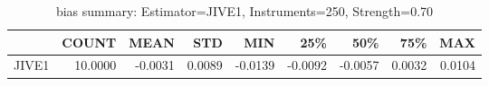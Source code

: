\begin{table}[ht]
\centering
\caption{bias summary: Estimator=JIVE1, Instruments=250, Strength=0.70}
\begin{tabular}{lrrrrrrrr}
\toprule
 & COUNT & MEAN & STD & MIN & 25\% & 50\% & 75\% & MAX \\
\midrule
JIVE1 & 10.0000 & -0.0031 & 0.0089 & -0.0139 & -0.0092 & -0.0057 & 0.0032 & 0.0104 \\
\bottomrule
\end{tabular}
\end{table}
